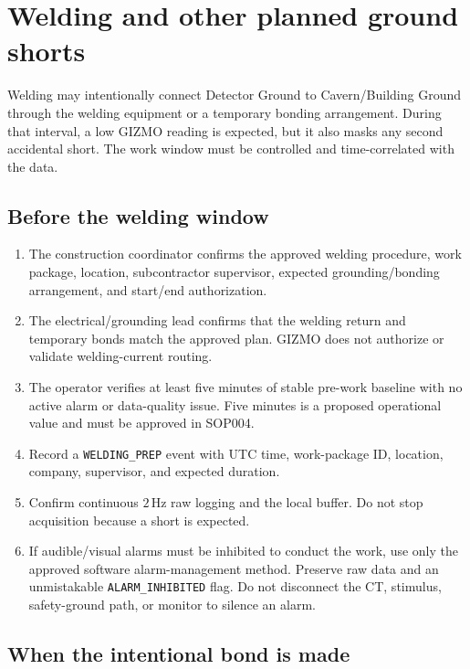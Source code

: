 \documentclass[11pt]{article}
\newcommand{\GIZMO}{\textsc{GIZMO}}
\begin{document}
\section{Welding and other planned ground shorts}

Welding may intentionally connect Detector Ground to Cavern/Building Ground through the welding equipment or a temporary bonding arrangement. During that interval, a low \GIZMO{} reading is expected, but it also masks any second accidental short. The work window must be controlled and time-correlated with the data.

\subsection{Before the welding window}

\begin{enumerate}
  \item The construction coordinator confirms the approved welding procedure, work package, location, subcontractor supervisor, expected grounding/bonding arrangement, and start/end authorization.
  \item The electrical/grounding lead confirms that the welding return and temporary bonds match the approved plan. \GIZMO{} does not authorize or validate welding-current routing.
  \item The operator verifies at least five minutes of stable pre-work baseline with no active alarm or data-quality issue. Five minutes is a proposed operational value and must be approved in SOP004.
  \item Record a \texttt{WELDING\_PREP} event with UTC time, work-package ID, location, company, supervisor, and expected duration.
  \item Confirm continuous $2\,\mathrm{Hz}$ raw logging and the local buffer. Do not stop acquisition because a short is expected.
  \item If audible/visual alarms must be inhibited to conduct the work, use only the approved software alarm-management method. Preserve raw data and an unmistakable \texttt{ALARM\_INHIBITED} flag. Do not disconnect the CT, stimulus, safety-ground path, or monitor to silence an alarm.
\end{enumerate}

\subsection{When the intentional bond is made}
\end{document}
